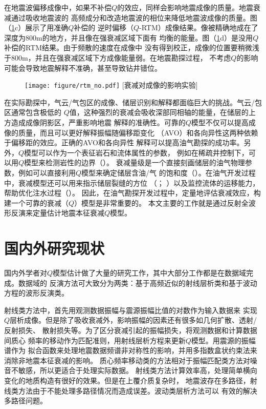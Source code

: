 在地震波偏移成像中，如果不补偿$Q$的效应，同样会影响地震成像的质量。地震衰减通过吸收地震波的
高频成分和改造地震波的相位来降低地震波成像的质量。图（\ref{fig:qrtm}c）展示了用准确$Q$补偿的
逆时偏移（$Q$-RTM）成像结果。像被精确地成在了深度为800m的地方，并且像在强衰减区域下面有
均衡的能量。图（\ref{fig:qrtm}d）是没用$Q$补偿的RTM结果。由于频散的速度在成像中
没有得到校正，成像的位置要稍微浅于800m，并且在强衰减区域下方成像能量弱。在地震勘探过程，
不考虑$Q$的影响可能会导致地震解释不准确，甚至导致钻井错位。

\begin{figure}[!htbp]
        \centering
        \texttt{[image: figure/rtm\_no.pdf]}
		[衰减对成像的影响实验]
        \label{fig:qrtm}
\end{figure}

在实际勘探中，气云/气包区的成像、储层识别和解释都面临巨大的挑战。气云/包区通常包含极低的
$Q$值，这种强烈的衰减会吸收深部同相轴的能量，在储层的上方造成成像阴影区，严重影响地震
解释的准确性。可靠的$Q$模型不仅可以提高成像的质量，而且可以更好解释振幅随偏移距变化
（AVO）和各向异性这两种依赖于偏移距的效应。正确的AVO和各向异性
解释可以提高油气勘探的成功率。另外，$Q$模型可以作为一个表征岩石和流体属性的参数，
例如在稀疏井控制下，可以用$Q$模型来检测岩性的边界（）。
衰减量级是一个直接刻画储层的油气物理参数，例如可以直接利用$Q$模型来确定储层含油/气
的饱和度（）。在油气开发过程中，衰减模型还可以用来指示储层裂缝的方位
（； ）以及监控流体的运移能力，
帮助优化注水过程（）。
因此，在油气勘探开发过程中，定量地评估衰减效应，构建一个可靠的衰减（$Q$）模型是非常重要的。
本文主要的工作就是通过反射全波形反演来定量估计地震本征衰减$Q$模型。

\vspace{0.5cm}
\section{国内外研究现状}

国内外学者对$Q$模型估计做了大量的研究工作，其中大部分工作都是在数据域完成。数据域的
反演方法可大致分为两类：基于高频近似的射线层析类和基于波动方程的波形反演类。

射线类方法中，首先用观测数据振幅与震源振幅比值的对数作为输入数据来
实现$Q$层析成像。但是除了吸收衰减外，影响振幅的因素还有很多如几何扩散、透射/反射损失、
散射损失等。为了区分衰减引起的振幅损失，将观测数据和计算数据间质心
频率的移动作为匹配准则，用射线层析方程来更新$Q$模型。用震源的振幅谱作为
拟合函数来处理地震数据频谱非对称性的影响，并用多指数盒状约束法来消除非地震本征衰减的影响。
质心频率移动类的方法相对于振幅匹配类方法对噪音不敏感，所以更适合于处理实际数据。
射线类方法计算效率高，处理简单横向变化的地质构造有很好的效果。但是在上覆介质复杂时，
地震波存在多路径，射线类方法由于不能处理多路径情况而造成误差。波动类层析方法可以
有效的解决多路径问题。

